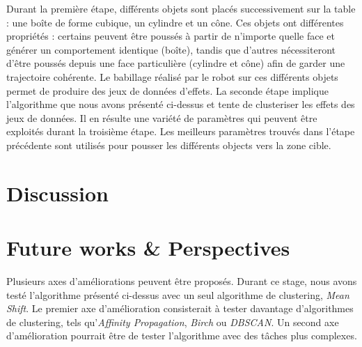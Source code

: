 \documentclass{llncs}
\begin{document}
Durant la première étape, différents objets sont placés successivement sur la table : une boîte de forme cubique, un cylindre et un cône. Ces objets ont différentes propriétés : certains peuvent être poussés à partir de n'importe quelle face et générer un comportement identique (boîte), tandis que d'autres nécessiteront d'être poussés depuis une face particulière (cylindre et cône) afin de garder une trajectoire cohérente. Le babillage réalisé par le robot sur ces différents objets permet de produire des jeux de données d'effets.
La seconde étape implique l'algorithme que nous avons présenté ci-dessus et tente de clusteriser les effets des jeux de données. Il en résulte une variété de paramètres qui peuvent être exploités durant la troisième étape.
Les meilleurs paramètres trouvés dans l'étape précédente sont utilisés pour pousser les différents objects vers la zone cible.



\section{Discussion}

\section{Future works \& Perspectives}

Plusieurs axes d'améliorations peuvent être proposés. Durant ce stage, nous avons testé l'algorithme présenté ci-dessus avec un seul algorithme de clustering, \textit{Mean Shift}. Le premier axe d'amélioration consisterait à tester davantage d'algorithmes de clustering, tels qu'\textit{Affinity Propagation}, \textit{Birch} ou \textit{DBSCAN}. Un second axe d'amélioration pourrait être de tester l'algorithme avec des tâches plus complexes.
\end{document}
